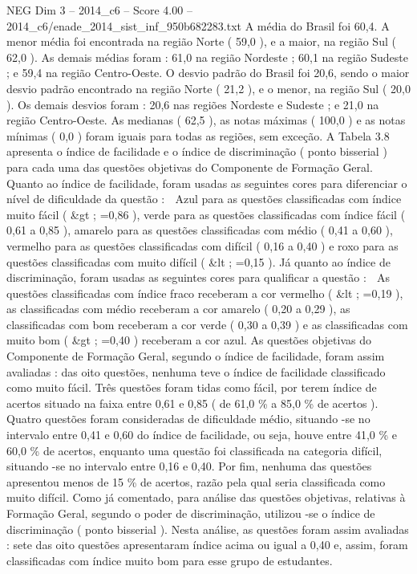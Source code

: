 \begin{textsample}{NEG Dim 3 – 2014\_c6 – Score 4.00 – 2014\_c6/enade\_2014\_sist\_inf\_950b682283.txt}
A média do Brasil foi 60,4.
A menor média foi encontrada na região Norte ( 59,0 ), e a maior, na região Sul ( 62,0 ).
As demais médias foram : 61,0 na região Nordeste ; 60,1 na região Sudeste ; e 59,4 na região Centro-Oeste.
O desvio padrão do Brasil foi 20,6, sendo o maior desvio padrão encontrado na região Norte ( 21,2 ), e o menor, na região Sul ( 20,0 ).
Os demais desvios foram : 20,6 nas regiões Nordeste e Sudeste ; e 21,0 na região Centro-Oeste.
As medianas ( 62,5 ), as notas máximas ( 100,0 ) e as notas mínimas ( 0,0 ) foram iguais para todas as regiões, sem exceção.
A Tabela 3.8 apresenta o índice de facilidade e o índice de discriminação ( ponto bisserial ) para cada uma das questões objetivas do Componente de Formação Geral.
Quanto ao índice de facilidade, foram usadas as seguintes cores para diferenciar o nível de dificuldade da questão :  Azul para as questões classificadas com índice muito fácil ( \&gt ; =0,86 ), verde para as questões classificadas com índice fácil ( 0,61 a 0,85 ), amarelo para as questões classificadas com médio ( 0,41 a 0,60 ), vermelho para as questões classificadas com difícil ( 0,16 a 0,40 ) e roxo para as questões classificadas com muito difícil ( \&lt ; =0,15 ).
Já quanto ao índice de discriminação, foram usadas as seguintes cores para qualificar a questão :  As questões classificadas com índice fraco receberam a cor vermelho ( \&lt ; =0,19 ), as classificadas com médio receberam a cor amarelo ( 0,20 a 0,29 ), as classificadas com bom receberam a cor verde ( 0,30 a 0,39 ) e as classificadas com muito bom ( \&gt ; =0,40 ) receberam a cor azul.
As questões objetivas do Componente de Formação Geral, segundo o índice de facilidade, foram assim avaliadas : das oito questões, nenhuma teve o índice de facilidade classificado como muito fácil.
Três questões foram tidas como fácil, por terem índice de acertos situado na faixa entre 0,61 e 0,85 ( de 61,0 \% a 85,0 \% de acertos ).
Quatro questões foram consideradas de dificuldade médio, situando -se no intervalo entre 0,41 e 0,60 do índice de facilidade, ou seja, houve entre 41,0 \% e 60,0 \% de acertos, enquanto uma questão foi classificada na categoria difícil, situando -se no intervalo entre 0,16 e 0,40.
Por fim, nenhuma das questões apresentou menos de 15 \% de acertos, razão pela qual seria classificada como muito difícil.
Como já comentado, para análise das questões objetivas, relativas à Formação Geral, segundo o poder de discriminação, utilizou -se o índice de discriminação ( ponto bisserial ).
Nesta análise, as questões foram assim avaliadas : sete das oito questões apresentaram índice acima ou igual a 0,40 e, assim, foram classificadas com índice muito bom para esse grupo de estudantes.

\end{textsample}

